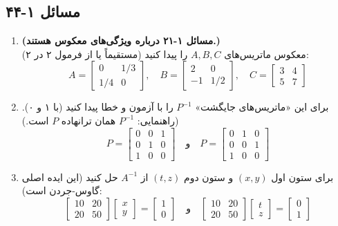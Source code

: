 \documentclass[12pt, a4paper]{book}
\begin{document}
	\subsection*{مسائل ۱-۴۴}
	\begin{enumerate}
		\item \textbf{(مسائل ۱-۲۱ درباره ویژگی‌های معکوس هستند.)}\\
		معکوس ماتریس‌های $A, B, C$ را پیدا کنید (مستقیماً یا از فرمول ۲ در ۲):
		\[ A = \begin{bmatrix} 0 & 1/3 \\ 1/4 & 0 \end{bmatrix}, \quad B = \begin{bmatrix} 2 & 0 \\ -1 & 1/2 \end{bmatrix}, \quad C = \begin{bmatrix} 3 & 4 \\ 5 & 7 \end{bmatrix} \]
		
		\item برای این «ماتریس‌های جایگشت» $P^{-1}$ را با آزمون و خطا پیدا کنید (با ۱ و ۰). (راهنمایی: $P^{-1}$ همان ترانهاده $P$ است.)
		\[ P = \begin{bmatrix} 0 & 0 & 1 \\ 0 & 1 & 0 \\ 1 & 0 & 0 \end{bmatrix} \quad \text{و} \quad P = \begin{bmatrix} 0 & 1 & 0 \\ 0 & 0 & 1 \\ 1 & 0 & 0 \end{bmatrix} \]
		
		\item برای ستون اول $(x,y)$ و ستون دوم $(t,z)$ از $A^{-1}$ حل کنید (این ایده اصلی گاوس-جردن است):
		\[ \begin{bmatrix} 10 & 20 \\ 20 & 50 \end{bmatrix} \begin{bmatrix} x \\ y \end{bmatrix} = \begin{bmatrix} 1 \\ 0 \end{bmatrix} \quad \text{و} \quad \begin{bmatrix} 10 & 20 \\ 20 & 50 \end{bmatrix} \begin{bmatrix} t \\ z \end{bmatrix} = \begin{bmatrix} 0 \\ 1 \end{bmatrix} \]
		

\end{enumerate}
\end{document}
